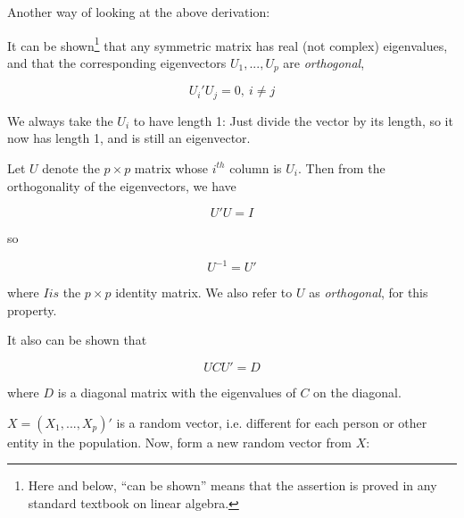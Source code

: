 % 
% 

Another way of looking at the above derivation:

It can be shown\footnote{Here and below, ``can be shown'' means that the
assertion is proved in any standard textbook on linear algebra.} that
any symmetric matrix has real (not complex) eigenvalues, and that the
corresponding eigenvectors $U_1,...,U_p$ are \textit{orthogonal},

\begin{equation}
U_i' U_j = 0, ~ i \neq j
\end{equation}

We always take the $U_i$ to have length 1:  Just divide the vector by
its length, so it now has length 1, and is still an eigenvector.  

Let $U$ denote the $p \times p$ matrix whose $i^{th}$ column is $U_i$.
Then from the orthogonality of the eigenvectors, we have

\begin{equation}
\label{uui}
U'U = I
\end{equation}

so

\begin{equation}
U^{-1} = U'
\end{equation}

where $I is$ the $p \times p$ identity matrix.  We also refer to $U$ as
\emph{orthogonal}, for this property.

It also can be shown that 

\begin{equation}
U C U' = D
\end{equation}

where $D$ is a diagonal matrix with the eigenvalues of $C$ on the
diagonal.

% 


$X = (X_1,...,X_p)'$ is a random vector, i.e. different for each person
or other entity in the population.  Now, form a new random vector from
$X$:

